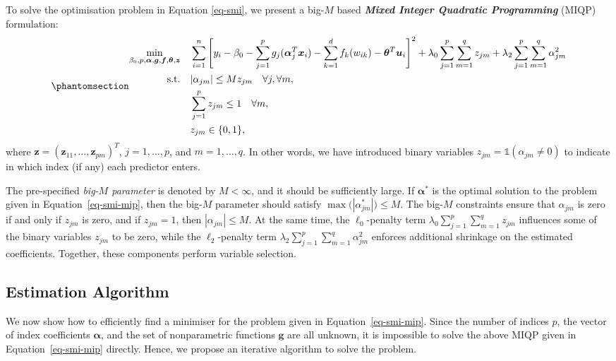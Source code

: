 \documentclass[
  11pt,
  a4paper,
]{article}
\begin{document}
To solve the optimisation problem in Equation \ref{eq-smi}, we present a
big-\(M\) based \textbf{\emph{Mixed Integer Quadratic Programming}}
(MIQP) formulation: \begin{equation}\phantomsection\label{eq-smi-mip}{
\begin{aligned}
  \min_{\beta_{0}, p, \bm{\alpha}, \bm{g}, \bm{f}, \bm{\theta}, \bm{z}} \quad & \sum_{i = 1}^{n}\Bigg [ y_{i} - \beta_{0} - \sum_{j = 1}^{p}{g_{j}(\bm{\alpha}_{j}^{T}\bm{x}_{i})} - \sum_{k = 1}^{d} {f_{k}(w_{ik})} - \bm{\theta}^{T}\bm{u}_{i}\Bigg ]^{2} + \lambda_{0}\sum_{j = 1}^{p}\sum_{m = 1}^{q}z_{jm} + \lambda_{2}\sum_{j = 1}^{p}\sum_{m = 1}^{q} \alpha_{jm}^{2} \\
  \text{s.t.} \quad & |\alpha_{jm}| \le Mz_{jm} \quad \forall j, \forall m, \\
  & \sum_{j = 1}^{p}z_{jm} \le 1 \quad \forall m, \\
  & z_{jm} \in \{0, 1\},
\end{aligned}
}\end{equation} where
\(\bm{z} = (\bm{z}_{11}, \dots, \bm{z}_{pm})^{T}\), \(j = 1, \dots, p\),
and \(m = 1, \dots, q\). In other words, we have introduced binary
variables \(z_{jm} = \mathbb{1}(\alpha_{jm} \neq 0)\) to indicate in
which index (if any) each predictor enters.

The pre-specified \emph{big-\(M\) parameter} is denoted by
\(M < \infty\), and it should be sufficiently large. If
\(\bm{\alpha^{*}}\) is the optimal solution to the problem given in
Equation~\ref{eq-smi-mip}, then the big-\(M\) parameter should satisfy
\(\max \big ( |\alpha_{jm}^{*} | \big) \le M\). The big-\(M\)
constraints ensure that \(\alpha_{jm}\) is zero if and only if
\(z_{jm}\) is zero, and if \(z_{jm} = 1\), then \(|\alpha_{jm}| \le M\).
At the same time, the \(\ell_{0}\)-penalty term
\(\lambda_{0}\sum_{j = 1}^{p}\sum_{m = 1}^{q}z_{jm}\) influences some of
the binary variables \(z_{jm}\) to be zero, while the
\(\ell_{2}\)-penalty term
\(\lambda_{2}\sum_{j = 1}^{p}\sum_{m = 1}^{q}\alpha_{jm}^{2}\) enforces
additional shrinkage on the estimated coefficients. Together, these
components perform variable selection.

\subsection{Estimation Algorithm}\label{estimation-algorithm}

We now show how to efficiently find a minimiser for the problem given in
Equation~\ref{eq-smi-mip}. Since the number of indices \(p\), the vector
of index coefficients \(\bm{\alpha}\), and the set of nonparametric
functions \(\bm{g}\) are all unknown, it is impossible to solve the
above MIQP given in Equation~\ref{eq-smi-mip} directly. Hence, we
propose an iterative algorithm to solve the problem.
\end{document}
